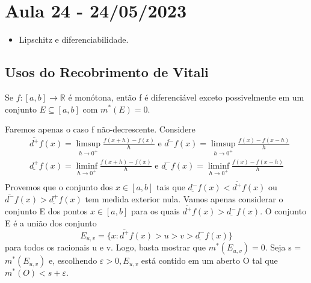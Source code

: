 \documentclass[analysis_notes.tex]{subfiles}
\begin{document}
\section{Aula 24 - 24/05/2023}
\begin{itemize}
	\item Lipschitz e diferenciabilidade.
\end{itemize}
\subsection{Usos do Recobrimento de Vitali}
\begin{lemma*}
	Se \(f:[a, b]\rightarrow \mathbb{R}\) é monótona, então f é diferenciável exceto
	possivelmente em um conjunto \(E\subseteq{[a, b]}\) com \(m^{*}(E) = 0\).
\end{lemma*}
\begin{proof*}
	Faremos apenas o caso f não-decrescente. Considere
	\begin{align*}
		 & \overline{d^{+}}f(x) = \limsup_{h\to 0^{+}} \frac{f(x+h)-f(x)}{h}\text{ e }\overline{d^{-}}f(x) = \limsup_{h\to 0^{+}}\frac{f(x) - f(x-h)}{h}   \\
		 & \underline{d^{+}}f(x) = \liminf_{h\to 0^{+}} \frac{f(x+h)-f(x)}{h}\text{ e }\underline{d^{-}}f(x) = \liminf_{h\to 0^{+}}\frac{f(x) - f(x-h)}{h} \\
	\end{align*}
	Provemos que o conjunto dos \(x\in[a, b]\) tais que \(\underline{d^{-}}f(x) < \overline{d^{+}}f(x)\)
	ou \(\overline{d^{-}}f(x) > \underline{d^{+}}f(x)\) tem medida exterior nula.
	Vamos apenas considerar o conjunto E dos pontos \(x\in[a, b]\) para os quais
	\(\overline{d^{+}}f(x) > \underline{d^{-}}f(x).\) O conjunto E é a união
	dos conjunto
	\[
		E_{u, v} = \{x: \overline{d^{+}}f(x) > u > v > \underline{d^{-}}f(x) \}
	\]
	para todos os racionais u e v. Logo, basta mostrar que \(m^{*}(E_{u, v}) = 0.\)
	Seja s = \(m^{*}(E_{u,v })\) e, escolhendo \(\varepsilon >0, E_{u, v}\) está contido
	em um aberto O tal que \(m^{*}(O) < s + \varepsilon .\)


\end{proof*}
\end{document}
